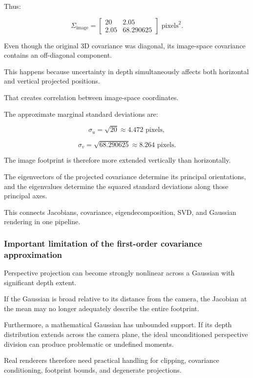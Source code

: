 Thus:

\[
\boxed{ \Sigma_{\text{image}}= \begin{bmatrix} 20&2.05\\ 2.05&68.290625 \end{bmatrix} \text{ pixels}^2 }.
\]

Even though the original 3D covariance was diagonal, its image-space covariance contains an off-diagonal component.

This happens because uncertainty in depth simultaneously affects both horizontal and vertical projected positions.

That creates correlation between image-space coordinates.

The approximate marginal standard deviations are:

\[
\sigma_u=\sqrt{20}\approx4.472\text{ pixels},
\]

\[
\sigma_v=\sqrt{68.290625}\approx8.264\text{ pixels}.
\]

The image footprint is therefore more extended vertically than horizontally.

The eigenvectors of the projected covariance determine its principal orientations, and the eigenvalues determine the squared standard deviations along those principal axes.

This connects Jacobians, covariance, eigendecomposition, SVD, and Gaussian rendering in one pipeline.

\subsubsection{Important limitation of the first-order covariance approximation}\label{02-foundations-ii-ch021-important-limitation-of-the-first-order-covariance-approximation}

\hypertarget{02-foundations-ii-ch021-important-limitation-of-the-first-order-covariance-approximation}{}

Perspective projection can become strongly nonlinear across a Gaussian with significant depth extent.

If the Gaussian is broad relative to its distance from the camera, the Jacobian at the mean may no longer adequately describe the entire footprint.

Furthermore, a mathematical Gaussian has unbounded support. If its depth distribution extends across the camera plane, the ideal unconditioned perspective division can produce problematic or undefined moments.

Real renderers therefore need practical handling for clipping, covariance conditioning, footprint bounds, and degenerate projections.

